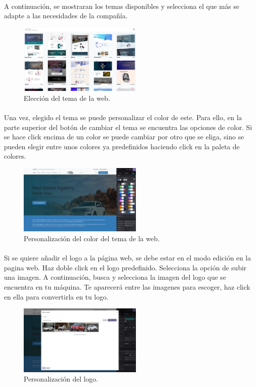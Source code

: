 \documentclass[paper=a4wide, fontsize=11pt]{report}	 %
\begin{document}
\paragraph{}
A continuación, se mostraran los temas disponibles y selecciona el que más se adapte a las necesidades de la compañía.
\begin{figure}[h]
    \centering
    \includegraphics[width=6cm]{elegirTema.png}
    \caption{Elección del tema de la web.}
    \label{fig:faqs}
\end{figure}
\paragraph{}
Una vez, elegido el tema se puede personalizar el color de este. Para ello, en la parte superior del botón de cambiar el tema se encuentra las opciones de color. Si se hace click encima de un color se puede cambiar por otro que se eliga, sino se pueden elegir entre unos colores ya predefinidos haciendo click en la paleta de colores.
\begin{figure}[h]
    \centering
    \includegraphics[width=6cm]{cambiarColor.png}
    \caption{Personalización del color del tema de la web.}
    \label{fig:faqs}
\end{figure}
\paragraph{}
Si se quiere añadir el logo a la página web, se debe estar en el modo edición en la pagina web. Haz doble click en el logo predefinido. Selecciona la opción de subir una imagen. A continuación, busca y selecciona la imagen del logo que se encuentra en tu máquina. Te aparecerá entre las imagenes para escoger, haz click en ella para convertirla en tu logo.
\newpage
\begin{figure}[h]
    \centering
    \includegraphics[width=6cm]{añadirLogo.png}
    \caption{Personalización del logo.}
    \label{fig:faqs}
\end{figure}
\end{document}

